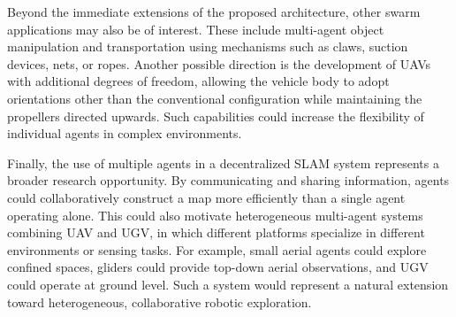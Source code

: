 Beyond the immediate extensions of the proposed architecture, other swarm applications may also be of interest. These include multi-agent object manipulation and transportation using mechanisms such as claws, suction devices, nets, or ropes. Another possible direction is the development of UAVs with additional degrees of freedom, allowing the vehicle body to adopt orientations other than the conventional configuration while maintaining the propellers directed upwards. Such capabilities could increase the flexibility of individual agents in complex environments.

Finally, the use of multiple agents in a decentralized \gls{SLAM} system represents a broader research opportunity. By communicating and sharing information, agents could collaboratively construct a map more efficiently than a single agent operating alone. This could also motivate heterogeneous multi-agent systems combining \gls{UAV} and \gls{UGV}, in which different platforms specialize in different environments or sensing tasks. For example, small aerial agents could explore confined spaces, gliders could provide top-down aerial observations, and \gls{UGV} could operate at ground level. Such a system would represent a natural extension toward heterogeneous, collaborative robotic exploration.